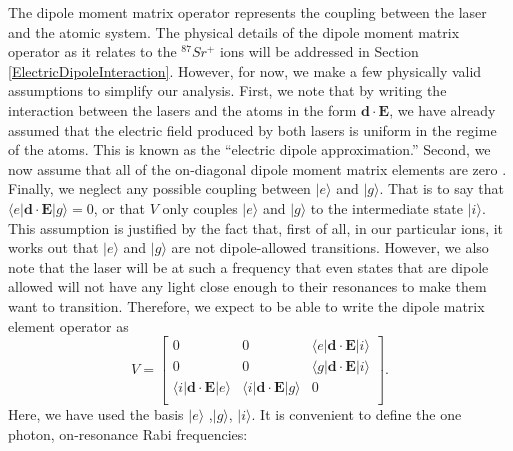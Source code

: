 The dipole moment matrix operator represents the coupling between the laser and the atomic system. The physical details of the dipole moment matrix operator as it relates to the $^{87}Sr^+$ ions will be addressed in Section\,\ref{ElectricDipoleInteraction}. 
However, for now, we make a few physically valid assumptions to simplify our analysis. First, we note that by writing the interaction between the lasers and the atoms in the form $\mathbf{d}\cdot\mathbf{E}$, we have already assumed that the electric field produced by both lasers is uniform in the regime of the atoms. This is known as the ``electric dipole approximation.'' Second, we now assume that all of the on-diagonal dipole moment matrix elements are zero \cite{cohenTannoudji}. Finally, we neglect any possible coupling between $|e\rangle$ and $|g\rangle$. That is to say that $\langle e|\mathbf{d}\cdot\mathbf{E}|g\rangle=0$, or that $V$ only couples $|e\rangle$ and $|g\rangle$ to the intermediate state $|i\rangle$. This assumption is justified by the fact that, first of all, in our particular ions, it works out that $|e\rangle$ and $|g\rangle$ are not dipole-allowed transitions. However, we also note that the laser will be at such a frequency that even states that are dipole allowed will not have any light close enough to their resonances to make them want to transition. Therefore, we expect to be able to write the dipole matrix element operator as 
\begin{equation}
\label{VSchrod}
V=
\begin{bmatrix}
0 & 0 & \langle e |\mathbf{d}\cdot\mathbf{E}|i\rangle\\
0 & 0 & \langle g |\mathbf{d}\cdot\mathbf{E}|i\rangle\\
\langle i |\mathbf{d}\cdot\mathbf{E}|e\rangle & \langle i |\mathbf{d}\cdot\mathbf{E}|g\rangle& 0 \\
\end{bmatrix}.
\end{equation}
Here, we have used the basis $|e\rangle$ ,$|g\rangle$, $|i\rangle$. 
It is convenient to define the one photon, on-resonance Rabi frequencies:

